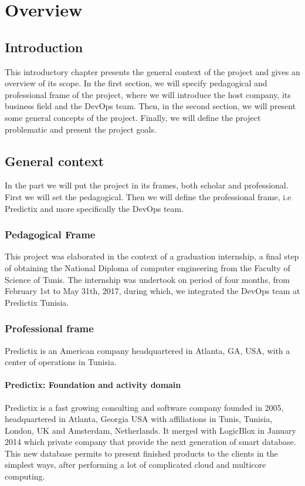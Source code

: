 \chapter{Overview}

\section*{Introduction}
This introductory chapter presents the general context of the project and gives
an overview of its scope. In the first section, we will specify pedagogical and
professional frame of the project, where we will introduce the host company, its
business field  and the DevOps team. Then, in the second section, we will
present some general concepts of the project. Finally, we will define the
project problematic and present the project goals.

\pagebreak

\section{General context}
In the part we will put the project in its frames, both scholar and
professional. First we will set the pedagogical. Then we will define the
professional frame, i.e Predictix and more specifically the DevOps team.

\subsection{Pedagogical Frame}
This project was elaborated in the context of a graduation internship, a final
step of obtaining the National Diploma of computer engineering from the Faculty
of Science of Tunis.
The internship was undertook on period of four months, from February 1st to May
31th, 2017, during which, we integrated the DevOps team at Predictix Tunisia.
\subsection{Professional frame}

Predictix is an American company headquartered in Atlanta, GA, USA, with a
center of operations in Tunisia.
\subsubsection{Predictix: Foundation and activity domain}

Predictix is a fast growing consulting and software company founded in 2005,
headquartered in Atlanta, Georgia USA with affiliations in Tunis, Tunisia,
London, UK and Amsterdam, Netherlands. It merged with LogicBlox in January 2014
which private company that provide the next generation of smart database. This
new database permits to present finished products to the clients in the simplest
ways, after performing a lot of complicated cloud and multicore computing.

